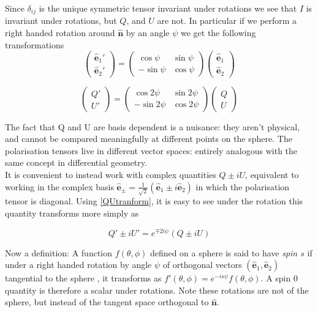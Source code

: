 \documentclass[a4paper,10pt]{article}
\renewcommand{\v}[1]{\mathbf{#1}}
\newcommand{\unit}[1]{\hat{\v{#1}}}
\begin{document}
Since $\delta_{ij}$ is the unique symmetric tensor invariant under rotations we see that $I$ is invariant under rotations, but $Q$, and $U$ are not. In particular if we perform a right handed rotation around $\unit{n}$ by an angle $\psi$ we get the following transformations
\begin{equation}
\begin{pmatrix}
\unit{e}_1'\\
\unit{e}_2' 
\end{pmatrix}
=
\begin{pmatrix}
\cos{\psi} & \sin{\psi}\\ 
-\sin{\psi} & \cos{\psi}
\end{pmatrix}
\begin{pmatrix}
\unit{e}_1\\
\unit{e}_2
\end{pmatrix}
\end{equation}


\begin{equation}
\begin{pmatrix}
Q'\\
U' 
\end{pmatrix}
=
\begin{pmatrix}
\cos{2\psi} & \sin{2\psi}\\ 
-\sin{2\psi} & \cos{2\psi}
\end{pmatrix}
\begin{pmatrix}
Q\\
U
\end{pmatrix}
\label{QUtranform}
\end{equation}

The fact that Q and U are basis dependent is a nuisance:  they aren't physical, and cannot be compared meaningfully at different points on the sphere. The polarisation tensors live in different vector spaces: entirely analogous with the same concept in differential geometry. \\

It is convenient to instead work with complex quantities $Q\pm iU$, equivalent to working in the complex basis $\unit{e}_\pm = \frac{1}{\sqrt{2}}(\unit{e}_1 \pm i\unit{e}_2)$ in which the polarisation tensor is diagonal. Using \ref{QUtranform}, it is easy to see under the rotation this quantity transforms more simply as

\begin{equation}
Q'\pm iU' = e^{\mp 2i\psi}(Q\pm iU)
\end{equation}

Now a definition: A function $f(\theta, \phi)$ defined on a sphere is said to have \textit{spin $s$} if under a right handed rotation by angle $\psi$ of orthogonal vectors $(\unit{e}_1, \unit{e}_2)$ tangential to the sphere , it transforms as $f'(\theta, \phi) = e^{-is\psi}f(\theta, \phi)$. A spin 0 quantity is therefore a scalar under rotations. Note these rotations are not of the sphere, but instead of the tangent space orthogonal to $\unit{n}$.\\
\end{document}
